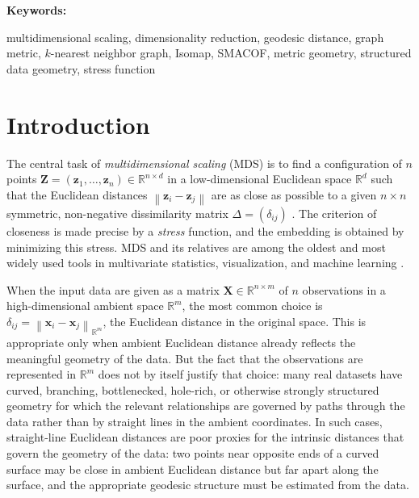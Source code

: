 \documentclass[11pt]{article}
\newcommand{\R}{\mathbb{R}}
\newcommand{\bx}{\mathbf{x}}
\newcommand{\bX}{\mathbf{X}}
\newcommand{\bz}{\mathbf{z}}
\newcommand{\bZ}{\mathbf{Z}}
\newcommand{\norm}[1]{\left\|#1\right\|}
\newenvironment{keywords}{%
  \par\smallskip\noindent\textbf{Keywords: }\ignorespaces
}{\par\smallskip}
\begin{document}
\begin{keywords}
  multidimensional scaling, dimensionality reduction, geodesic distance,
  graph metric, $k$-nearest neighbor graph, Isomap, SMACOF, metric geometry,
  structured data geometry, stress function
\end{keywords}

\section{Introduction}
\label{sec:introduction}

The central task of \emph{multidimensional scaling} (MDS) is to find a
configuration of $n$ points $\bZ = (\bz_1, \ldots, \bz_n) \in \R^{n \times
d}$ in a low-dimensional Euclidean space $\R^d$ such that the Euclidean
distances $\norm{\bz_i - \bz_j}$ are as close as possible to a given $n
\times n$ symmetric, non-negative dissimilarity matrix $\Delta = (\delta_{ij})$
\citep{torgerson1952multidimensional, kruskal1964multidimensional,
borg2005modern, cox2000multidimensional}.  The criterion of closeness is made
precise by a \emph{stress} function, and the embedding is obtained by
minimizing this stress.  MDS and its relatives are among the oldest and most
widely used tools in multivariate statistics, visualization, and machine
learning \citep{shepard1962analysis, sammon1969nonlinear,
vandermaaten2008tsne, mcinnes2018umap}.

When the input data are given as a matrix $\bX \in \R^{n \times m}$ of $n$
observations in a high-dimensional ambient space $\R^m$, the most common
choice is $\delta_{ij} = \norm{\bx_i - \bx_j}_{\R^m}$, the Euclidean
distance in the original space.  This is appropriate only when ambient
Euclidean distance already reflects the meaningful geometry of the data.
But the fact that the observations are represented in $\R^m$ does not by
itself justify that choice: many real datasets have curved, branching,
bottlenecked, hole-rich, or otherwise strongly structured geometry for
which the relevant relationships are governed by paths through the data
rather than by straight lines in the ambient coordinates.  In such cases,
straight-line Euclidean
distances are poor proxies for the intrinsic distances that govern the
geometry of the data: two points near opposite ends of a curved surface
may be close in ambient Euclidean distance but far apart along the surface,
and the appropriate geodesic structure must be estimated from the data.
\end{document}
